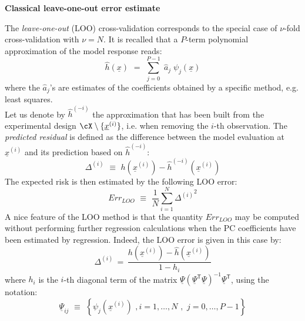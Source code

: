 {  \textbf{Classical leave-one-out error estimate} \vspace{2mm}

  The \emph{leave-one-out} (LOO) cross-validation corresponds to the special case of $\nu$-fold cross-validation with $\nu = N$. It is recalled that a $P$-term polynomial approximation of the model response reads:
  \begin{equation}
    \widehat{h}(\underline{x}) \, \, = \, \,  \sum_{j=0}^{P-1} \; \widehat{a}_{j} \; \psi_{j}(\underline{x})
  \end{equation}
  where the $\widehat{a}_{j}$'s are estimates of the coefficients obtained by a specific method, e.g. least squares. \\

  Let us denote by $\widehat{h}^{(-i)}$ the approximation that has been built from the experimental design $\cX \setminus \{\underline{x}^{(i)}\}$, i.e. when removing the $i$-th observation. The \emph{predicted residual} is defined as the difference between the model evaluation at $\underline{x}^{(i)}$ and its prediction based on $\widehat{h}^{(-i)}$:
  \begin{equation} \label{eq:4.3:5}
    \Delta^{(i)} \, \, \equiv \, \,  h(\underline{x}^{(i)}) - \widehat{h}^{(-i)}(\underline{x}^{(i)})
  \end{equation}
  The expected risk is then estimated by the following LOO error:
  \begin{equation}\label{eq:4.3:6}
    Err_{LOO} \, \, \equiv \, \, \frac{1}{N} \sum_{i=1}^{N} {\Delta^{(i)}}^{2}
  \end{equation}
  A nice feature of the LOO method is that the quantity $Err_{LOO}$ may be computed without performing further regression calculations when the PC coefficients have been estimated by regression. Indeed, the LOO error is given in this case by:
  \begin{equation} \label{eq:4.3:7}
    \Delta^{(i)} \, = \,
    \frac{h(\underline{x}^{(i)}) - \widehat{h}(\underline{x}^{(i)})}{1 - h_i}
  \end{equation}
  where $h_i$ is the $i$-th diagonal term of the matrix $\underline{\Psi} (\underline{\Psi}^{\textsf{T}}\underline{\Psi})^{-1}\underline{\Psi}^{\textsf{T}}$, using the notation:
  \begin{equation} \label{eq:4.3:7bis}
    \underline{\Psi}_{ij} \, \, \equiv \, \, \left\{\psi_{j}(\underline{x}^{(i)}) \, \, , i=1,\dots,N  \, \, , \, \, j=0,\dots,P-1 \right\}
  \end{equation}

}
